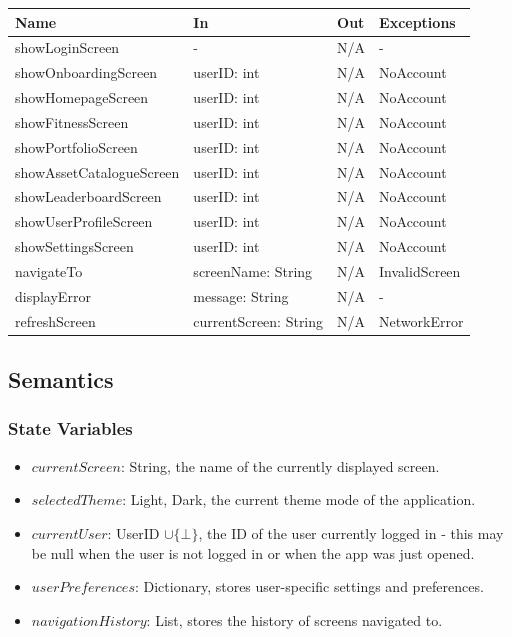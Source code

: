 \documentclass[12pt, titlepage]{article}
\begin{document}
\begin{center}
\begin{tabular}{p{5cm} p{3cm} p{2cm} p{3cm}}
\hline
\textbf{Name} & \textbf{In} & \textbf{Out} & \textbf{Exceptions} \\
\hline
showLoginScreen & - & N/A & - \\
showOnboardingScreen & userID: int & N/A & NoAccount \\
showHomepageScreen & userID: int & N/A & NoAccount \\
showFitnessScreen & userID: int & N/A & NoAccount \\
showPortfolioScreen & userID: int & N/A & NoAccount \\
showAssetCatalogueScreen & userID: int & N/A & NoAccount \\
showLeaderboardScreen & userID: int & N/A & NoAccount \\
showUserProfileScreen & userID: int & N/A & NoAccount \\
showSettingsScreen & userID: int & N/A & NoAccount \\
navigateTo & screenName: String & N/A & InvalidScreen \\
displayError & message: String & N/A & - \\
refreshScreen & currentScreen: String & N/A & NetworkError \\
\hline
\end{tabular}
\end{center}

\subsection{Semantics}

\subsubsection{State Variables}

\begin{itemize}
  \item $\mathit{currentScreen}$: String, the name of the currently displayed screen.
  \item $\mathit{selectedTheme}$: {Light, Dark}, the current theme mode of the application.
  \item $\mathit{currentUser}$: UserID $\cup \{\bot\}$, the ID of the user currently logged in - this may be null when the user is not logged in or when the app was just opened.  \item $\mathit{userPreferences}$: Dictionary, stores user-specific settings and preferences.
  \item $\mathit{navigationHistory}$: List, stores the history of screens navigated to.
\end{itemize}
\end{document}
